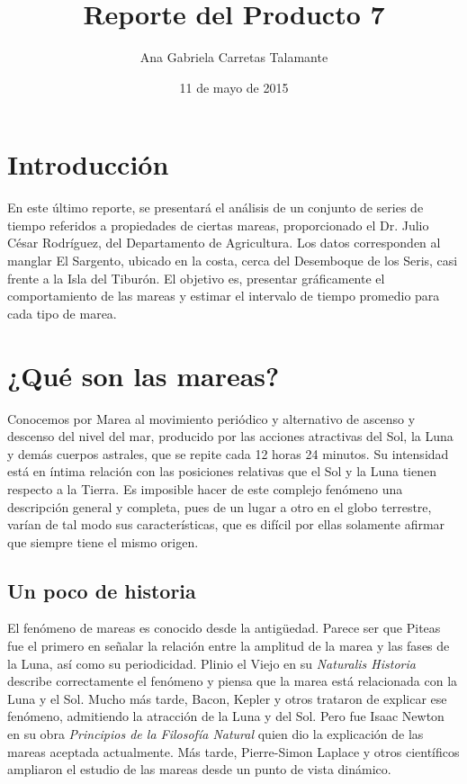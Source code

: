 \documentclass[a4paper]{article}
\title{Reporte del Producto 7}
\author{Ana Gabriela Carretas Talamante}
\date{11 de mayo de 2015}
\begin{document}
\maketitle
\section{Introducción}
En este último reporte, se presentará el análisis de un conjunto de series de tiempo referidos a propiedades de ciertas mareas, proporcionado el Dr. Julio César Rodríguez, del Departamento de Agricultura. Los datos corresponden al manglar El Sargento, ubicado en la costa, cerca del Desemboque de los Seris, casi frente a la Isla del Tiburón. El objetivo es, presentar gráficamente el comportamiento de las mareas y estimar el intervalo de tiempo promedio para cada tipo de marea.
 
\section{¿Qué son las mareas?}
Conocemos por Marea al movimiento periódico y alternativo de ascenso y descenso del nivel del mar, producido por las acciones atractivas del Sol, la Luna y demás cuerpos astrales, que se repite cada 12 horas 24 minutos. Su intensidad está en íntima relación con las posiciones relativas que el Sol y la Luna tienen respecto a la Tierra. Es imposible hacer de este complejo fenómeno una descripción general y completa, pues de un lugar a otro en el globo terrestre, varían de tal modo sus características, que es difícil por ellas solamente afirmar que siempre tiene el mismo origen.

\subsection{Un poco de historia}
El fenómeno de mareas es conocido desde la antigüedad. Parece ser que Piteas fue el primero en señalar la relación entre la amplitud de la marea y las fases de la Luna, así como su periodicidad. Plinio el Viejo en su \textit{Naturalis Historia} describe correctamente el fenómeno y piensa que la marea está relacionada con la Luna y el Sol. Mucho más tarde, Bacon, Kepler y otros trataron de explicar ese fenómeno, admitiendo la atracción de la Luna y del Sol. Pero fue Isaac Newton en su obra \textit{Principios de la Filosofía Natural} quien dio la explicación de las mareas aceptada actualmente. Más tarde, Pierre-Simon Laplace  y otros científicos ampliaron el estudio de las mareas desde un punto de vista dinámico.
\end{document}
